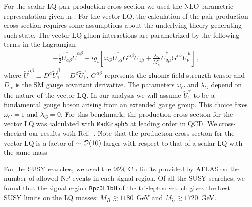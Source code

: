 \documentclass[aps,twocolumn,showpacs,preprintnumbers,amsmath,amssymb,floatfix,nofootinbib]{revtex4-1}
\newcommand{\cO}{{\cal O}}
\begin{document}
For the scalar LQ pair production cross-section we used the NLO parametric representation given in \cite{Mandal:2015lca}. For the vector LQ, the calculation of the pair production cross-section requires some assumptions about the underlying theory generating such state. The vector LQ-gluon interactions are parametrized by the following terms in the Lagrangian~\cite{Blumlein:1996qp}
%
\begin{align}
- \frac{1}{2} \widetilde{U}_{\alpha\beta}^\dagger\widetilde{U}^{\alpha\beta} -i   g_s\left[ \omega_G   \widetilde{U}_{1\alpha}^\dagger G^{\alpha\beta} \widetilde{U}_{1\beta}    +  \frac{\lambda_G}{M_{\widetilde{U}}^2}   \widetilde{U}_{\sigma \mu}^\dagger  G^{\nu \sigma}   \widetilde{U}_{\nu}^{\,\mu}      \right]  \,,
\end{align}
%
where  $\widetilde{U}^{\alpha\beta}\equiv D^\alpha\widetilde{U}^\beta_1\ - D^\beta\widetilde{U}^\alpha_1$, $G^{\alpha \beta}$ represents the gluonic field strength tensor and $D_{\alpha}$ is the SM gauge covariant derivative.    The parameters $\omega_G$ and $\lambda_G$ depend on the nature of the vector LQ. In our analysis we will assume $\widetilde{U}^\alpha_1$ to be a fundamental gauge boson arising from an extended gauge group. This choice fixes $\omega_G=1$ and $\lambda_G=0$. For this benchmark, the production cross-section for the vector LQ was calculated with {\tt MadGraph5} at leading order in QCD. We cross-checked our results with Ref.~\cite{Belyaev:2005ew}. Note that the production cross-section for the vector LQ is a factor of $\sim\cO(10)$ larger with respect to that of a scalar LQ with the same mass

For the SUSY searches, we used the 95\% CL limits provided by ATLAS on the number of allowed NP events in each signal region. Of all the SUSY searches, we found that the signal region {\tt Rpc3L1bH} of the tri-lepton search \cite{Aaboud:2017dmy} gives the best SUSY limits on the LQ masses: $M_R \gtrsim 1180$~GeV and $M_{\widetilde U} \gtrsim1720$~GeV. 
\end{document}

